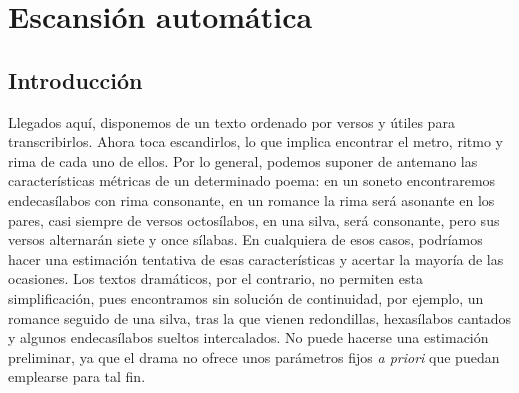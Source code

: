 \chapter{Escansión automática}
\section{Introducción}

Llegados aquí, disponemos de un texto ordenado por versos y útiles para transcribirlos. Ahora toca escandirlos, lo que implica encontrar el metro, ritmo y rima de cada uno de ellos. Por lo general, podemos suponer de antemano las características métricas de un determinado poema: en un soneto encontraremos endecasílabos con rima consonante, en un romance la rima será asonante en los pares, casi siempre de versos octosílabos, en una silva, será consonante, pero sus versos alternarán siete y once sílabas. En cualquiera de esos casos, podríamos hacer una estimación tentativa de esas características y acertar la mayoría de las ocasiones. Los textos dramáticos, por el contrario, no permiten esta simplificación, pues encontramos sin solución de continuidad, por ejemplo, un romance seguido de una silva, tras la que vienen redondillas, hexasílabos cantados y algunos endecasílabos sueltos intercalados. No puede hacerse una estimación preliminar, ya que el drama no ofrece unos parámetros fijos \textit{a priori} que puedan emplearse para tal fin.

